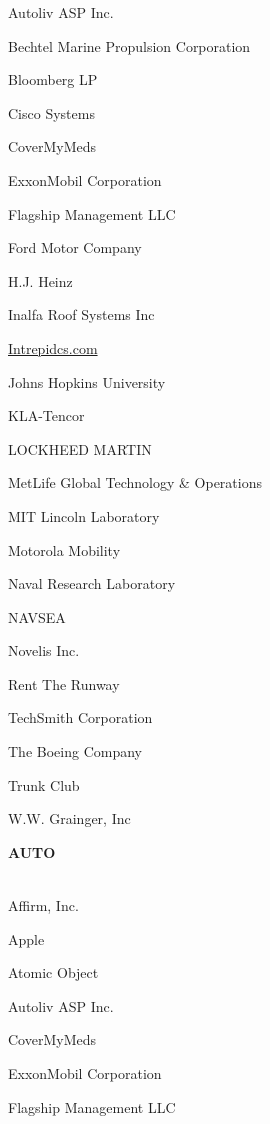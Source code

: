 \documentclass[twoside]{article}
\begin{document}
\begin{center}
\begin{multicols}{5}
\begin{FlushLeft}
\begin{compactitem}
\item Autoliv ASP Inc.
\item Bechtel Marine Propulsion Corporation
\item Bloomberg LP
\item Cisco Systems
\item CoverMyMeds
\item ExxonMobil Corporation
\item Flagship Management LLC
\item Ford Motor Company
\item H.J. Heinz
\item Inalfa Roof Systems Inc
\item \url{Intrepidcs.com}
\item Johns Hopkins University
\item KLA-Tencor
\item LOCKHEED MARTIN
\item MetLife Global Technology \& Operations
\item MIT Lincoln Laboratory
\item Motorola Mobility
\item Naval Research Laboratory
\item NAVSEA
\item Novelis Inc.
\item Rent The Runway
\item TechSmith Corporation
\item The Boeing Company
\item Trunk Club
\item W.W. Grainger, Inc
\end{compactitem}
        \end{FlushLeft}
        \vspace{1em}
        {\fontsize{14}{16}\selectfont \bf AUTO}\\
        \vspace{-1em}
        ~\hrulefill~
        \vspace{-.9em}
        \begin{FlushLeft}
        \begin{compactitem}
        \item Affirm, Inc.
\item Apple
\item Atomic Object
\item Autoliv ASP Inc.
\item CoverMyMeds
\item ExxonMobil Corporation
\item Flagship Management LLC

\end{compactitem}
\end{FlushLeft}
\end{multicols}
\end{center}
\end{document}
